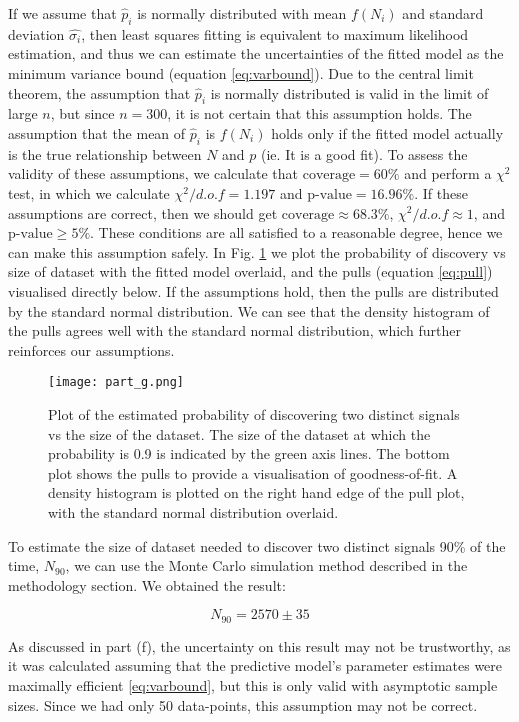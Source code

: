 \documentclass{article}
\begin{document}
If we assume that $\hat{p}_i$ is normally distributed with mean $f(N_i)$ and standard deviation $\hat{\sigma_i}$, then least squares fitting is equivalent to maximum likelihood estimation, and thus we can estimate the uncertainties of the fitted model as the minimum variance bound (equation \ref{eq:varbound}). Due to the central limit theorem, the assumption that $\hat{p}_i$ is normally distributed is valid in the limit of large $n$, but since $n = 300$, it is not certain that this assumption holds. The assumption that the  mean of $\hat{p}_i$ is $f(N_i)$ holds only if the fitted model actually is the true relationship between $N$ and $p$ (ie. It is a good fit). To assess the validity of these assumptions, we calculate that $\text{coverage} = 60\%$ and perform a $\chi^2$ test, in which we calculate $\chi^2/d.o.f = 1.197$ and $\text{p-value} = 16.96\%$. If these assumptions are correct, then we should get $\text{coverage} \approx68.3\%$, $\chi^2/d.o.f \approx 1$, and $\text{p-value} \geq 5\%$. These conditions are all satisfied to a reasonable degree, hence we can make this assumption safely. In Fig. \ref{fig:g} we plot the probability of discovery vs size of dataset with the fitted model overlaid, and the pulls (equation \ref{eq:pull}) visualised directly below. If the assumptions hold, then the pulls are distributed by the standard normal distribution. We can see that the density histogram of the pulls agrees well with the standard normal distribution, which further reinforces our assumptions.

\begin{figure}[h]
\centering
\texttt{[image: part\_g.png]}
\caption{Plot of the estimated probability of discovering two distinct signals vs the size of the dataset. The size of the dataset at which the probability is 0.9 is indicated by the green axis lines. The bottom plot shows the pulls to provide a visualisation of goodness-of-fit. A density histogram is plotted on the right hand edge of the pull plot, with the standard normal distribution overlaid.}
\label{fig:g}
\end{figure} 

To estimate the size of dataset needed to discover two distinct signals 90\% of the time, $N_{90}$, we can use the Monte Carlo simulation method described in the methodology section. We obtained the result:

$$ N_{90} = 2570 \pm 35 $$

As discussed in part (f), the uncertainty on this result may not be trustworthy, as it was calculated assuming that the predictive model's parameter estimates were maximally efficient \ref{eq:varbound}, but this is only valid with asymptotic sample sizes. Since we had only 50 data-points, this assumption may not be correct. 

\end{document}
